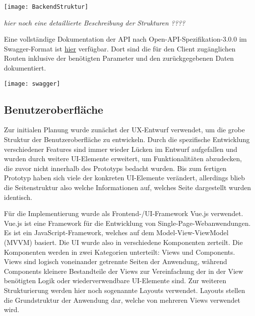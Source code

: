 \vspace{20pt}
\begin{center}
    \begin{minipage}{0.7\linewidth}
        \texttt{[image: BackendStruktur]}
    \end{minipage}
\end{center}
\vspace{20pt}

\emph{hier noch eine detaillierte Beschreibung der Strukturen ????}

Eine vollständige Dokumentation der API nach Open-API-Spezifikation-3.0.0 im Swagger-Format ist \href{https://116.203.140.167.nip.io/api-docs/}{hier} verfügbar. Dort sind die für den Client zugänglichen Routen inklusive der benötigten Parameter und den zurückgegebenen Daten dokumentiert.

\vspace{20pt}
\begin{center}
    \begin{minipage}{0.95\linewidth}
        \texttt{[image: swagger]}
    \end{minipage}
\end{center}
\vspace{20pt}

\subsection{Benutzeroberfläche}
Zur initialen Planung wurde zunächst der UX-Entwurf verwendet, um die grobe Struktur der Benutzeroberfläche zu entwickeln. Durch die spezifische Entwicklung verschiedener Features sind immer wieder Lücken im Entwurf aufgefallen und wurden durch weitere UI-Elemente erweitert, um Funktionalitäten abzudecken, die zuvor nicht innerhalb des Prototyps bedacht wurden. Bis zum fertigen Prototyp haben sich viele der konkreten UI-Elemente verändert, allerdings blieb die Seitenstruktur also welche Informationen auf, welches Seite dargestellt wurden identisch.

Für die Implementierung wurde als Frontend-/UI-Framework Vue.js verwendet. Vue.js ist eine Framework für die Entwicklung von Single-Page-Webanwendungen. Es ist ein JavaScript-Framework, welches auf dem Model-View-ViewModel (MVVM) basiert. Die UI wurde also in verschiedene Komponenten zerteilt. Die Komponenten werden in zwei Kategorien unterteilt: Views und Components. Views sind logisch voneinander getrennte Seiten der Anwendung, während Components kleinere Bestandteile der Views zur Vereinfachung der in der View benötigten Logik oder wiederverwendbare UI-Elemente sind. Zur weiteren Strukturierung werden hier noch sogenannte Layouts verwendet. Layouts stellen die Grundstruktur der Anwendung dar, welche von mehreren Views verwendet wird.

